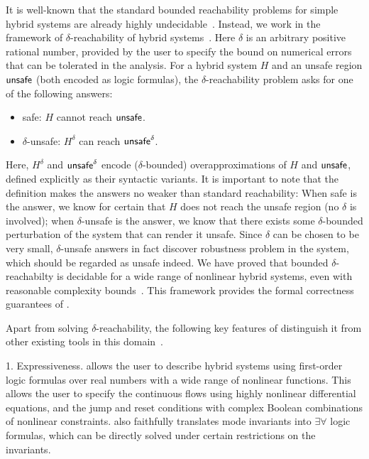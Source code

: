 It is well-known that the standard bounded reachability problems for
simple hybrid systems are already highly
undecidable~\cite{DBLP:conf/hybrid/AlurCHH92}.
Instead, we work in the framework of $\delta$-reachability of hybrid systems~\cite{DBLP:journals/corr/GaoKCC14}.
Here $\delta$ is an arbitrary positive rational number, provided by the user to
specify the bound on numerical errors that can be tolerated in the analysis.
For a hybrid system $H$ and an unsafe region $\mathsf{unsafe}$ (both encoded as logic formulas),
the $\delta$-reachability problem asks for one of the following answers:
\begin{itemize}
        \item {\sf safe}: $H$ cannot reach $\mathsf{unsafe}$.
        \item {\sf $\delta$-unsafe}: $H^{\delta}$ can reach $\mathsf{unsafe}^{\delta}$.
\end{itemize}
Here, $H^{\delta}$ and $\mathsf{unsafe}^{\delta}$ encode ($\delta$-bounded) overapproximations
of $H$ and $\mathsf{unsafe}$, defined explicitly as their syntactic variants.%
It is important to note that the definition makes the answers no weaker than standard reachability:
When {\sf safe} is the answer, we know for certain that $H$ does not reach
the unsafe region (no $\delta$ is involved); when {\sf $\delta$-unsafe} is the answer,
we know that there exists some $\delta$-bounded perturbation of the system that can render it unsafe.
Since $\delta$ can be chosen to be very small, {\sf$\delta$-unsafe} answers in fact
discover robustness problem in the system, which should be regarded as unsafe indeed.
We have proved that bounded $\delta$-reachabilty is decidable for a wide range
of nonlinear hybrid systems, even with reasonable complexity bounds~\cite{DBLP:journals/corr/GaoKCC14}.
This framework provides the formal correctness guarantees of \dReach{}.

Apart from solving $\delta$-reachability, the following key features of \dReach{}
distinguish it from other existing tools in this
domain~\cite{DBLP:journals/jlp/FranzleTE10,DBLP:conf/cav/FrehseGDCRLRGDM11,DBLP:journals/tac/AlthoffK14,DBLP:conf/hybrid/Frehse05,DBLP:conf/icons/HerdeEFT08,DBLP:conf/rtss/ChenAS12,DBLP:conf/aaai/CimattiMT12}.

1. Expressiveness. \dReach{} allows the user to describe hybrid systems using first-order
logic formulas over real numbers with a wide range of nonlinear functions. This allows
the user to specify the continuous flows using highly nonlinear differential equations,
and the jump and reset conditions with complex Boolean combinations of nonlinear constraints.
\dReach{} also faithfully translates mode invariants into $\exists\forall$ logic formulas,
which can be directly solved under certain restrictions on the invariants.

